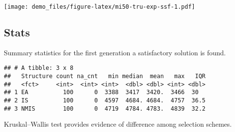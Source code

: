 \documentclass[]{book}
\newenvironment{Shaded}{\begin{snugshade}}{\end{snugshade}}
\newcommand{\CharTok}[1]{\textcolor[rgb]{0.31,0.60,0.02}{#1}}
\newcommand{\DataTypeTok}[1]{\textcolor[rgb]{0.13,0.29,0.53}{#1}}
\newcommand{\DecValTok}[1]{\textcolor[rgb]{0.00,0.00,0.81}{#1}}
\newcommand{\KeywordTok}[1]{\textcolor[rgb]{0.13,0.29,0.53}{\textbf{#1}}}
\newcommand{\NormalTok}[1]{#1}
\newcommand{\OperatorTok}[1]{\textcolor[rgb]{0.81,0.36,0.00}{\textbf{#1}}}
\newcommand{\OtherTok}[1]{\textcolor[rgb]{0.56,0.35,0.01}{#1}}
\newcommand{\StringTok}[1]{\textcolor[rgb]{0.31,0.60,0.02}{#1}}
\begin{document}
\texttt{[image: demo\_files/figure-latex/mi50-tru-exp-ssf-1.pdf]}

\hypertarget{stats-28}{%
\subsection{Stats}\label{stats-28}}

Summary statistics for the first generation a satisfactory solution is found.

\begin{Shaded}
\end{Shaded}

\begin{verbatim}
## # A tibble: 3 x 8
##   Structure count na_cnt   min median  mean   max   IQR
##   <fct>     <int>  <int> <int>  <dbl> <dbl> <int> <dbl>
## 1 EA          100      0  3388  3417  3420.  3466  30  
## 2 IS          100      0  4597  4684. 4684.  4757  36.5
## 3 NMIS        100      0  4719  4784. 4783.  4839  32.2
\end{verbatim}

Kruskal--Wallis test provides evidence of difference among selection schemes.
\end{document}
